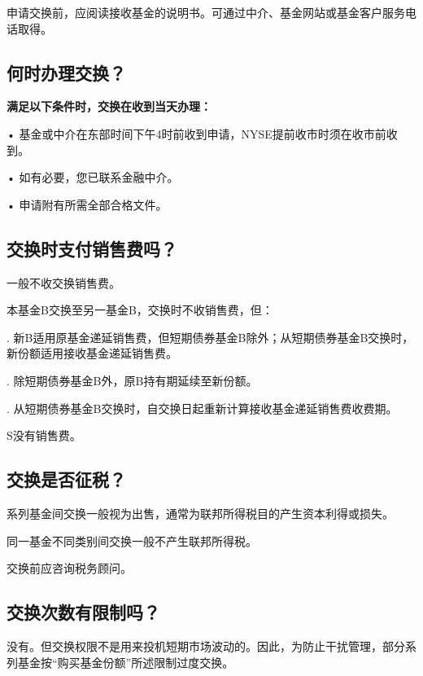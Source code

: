 \documentclass[UTF8,fontset=none,11pt,a4paper]{ctexart}
\begin{document}
申请交换前，应阅读接收基金的说明书。可通过中介、基金网站或基金客户服务电\allowbreak\mbox{话取得。}


\par{}\label{originalpage18}

\subsection*{何时办理交换？}
\textbf{满足以下条件时，交换在收到当天办理：}

\noindent • 基金或中介在东部时间下午4时前收到申请，NYSE提前收市时须在收\allowbreak\mbox{市前收到。}\par\smallskip
\noindent • 如有必要，您已联系\allowbreak\mbox{金融中介。}\par\smallskip
\noindent • 申请附有所需全部\allowbreak\mbox{合格文件。}\par\smallskip
\subsection*{交换时支付销售费吗？}
一般不收交\allowbreak\mbox{换销售费。}

本基金B交换至另一基金B，交换时不收销售费，但：

. 新B适用原基金递延销售费，但短期债券基金B除外；从短期债券基金B交换时，新份额适用接收基金递\allowbreak\mbox{延销售费。}


. 除短期债券基金B外，原B持有期延续\allowbreak\mbox{至新份额。}


. 从短期债券基金B交换时，自交换日起重新计算接收基金递延销售\allowbreak\mbox{费收费期。}


S没\allowbreak\mbox{有销售费。}

\subsection*{交换是否征税？}
系列基金间交换一般视为出售，通常为联邦所得税目的产生资本利\allowbreak\mbox{得或损失。}

同一基金不同类别间交换一般不产生联\allowbreak\mbox{邦所得税。}

交换前应咨询\allowbreak\mbox{税务顾问。}

\subsection*{交换次数有限制吗？}
没有。但交换权限不是用来投机短期市场波动的。因此，为防止干扰管理，部分系列基金按“购买基金份额”所述限制\allowbreak\mbox{过度交换。}
\end{document}
